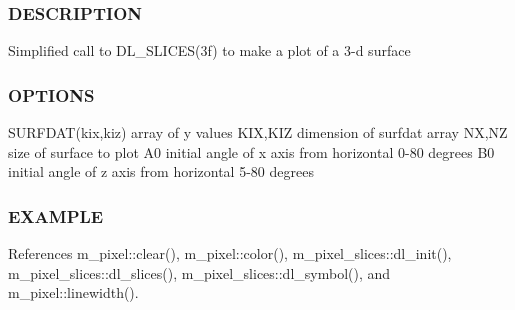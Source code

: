 \subsubsection*{D\+E\+S\+C\+R\+I\+P\+T\+I\+ON}

Simplified call to D\+L\+\_\+\+S\+L\+I\+C\+E\+S(3f) to make a plot of a 3-\/d surface

\subsubsection*{O\+P\+T\+I\+O\+NS}

S\+U\+R\+F\+D\+A\+T(kix,kiz) array of y values K\+IX,K\+IZ dimension of surfdat array NX,NZ size of surface to plot A0 initial angle of x axis from horizontal 0-\/80 degrees B0 initial angle of z axis from horizontal 5-\/80 degrees

\subsubsection*{E\+X\+A\+M\+P\+LE}

References m\+\_\+pixel\+::clear(), m\+\_\+pixel\+::color(), m\+\_\+pixel\+\_\+slices\+::dl\+\_\+init(), m\+\_\+pixel\+\_\+slices\+::dl\+\_\+slices(), m\+\_\+pixel\+\_\+slices\+::dl\+\_\+symbol(), and m\+\_\+pixel\+::linewidth().


